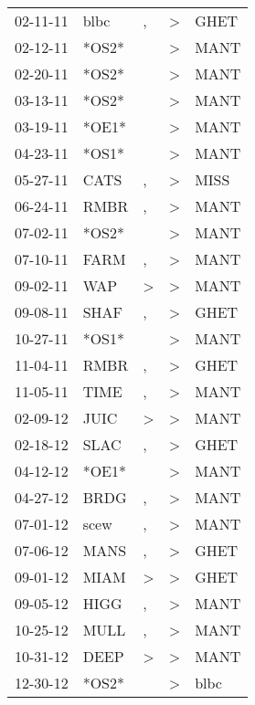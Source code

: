\begin{supertabular}{lllll}
 02-11-11 &   blbc &             , &  \textgreater &  GHET \\
 02-12-11 &  *OS2* &               &  \textgreater &  MANT \\
 02-20-11 &  *OS2* &               &  \textgreater &  MANT \\
 03-13-11 &  *OS2* &               &  \textgreater &  MANT \\
 03-19-11 &  *OE1* &               &  \textgreater &  MANT \\
 04-23-11 &  *OS1* &               &  \textgreater &  MANT \\
 05-27-11 &   CATS &             , &  \textgreater &  MISS \\
 06-24-11 &   RMBR &             , &  \textgreater &  MANT \\
 07-02-11 &  *OS2* &               &  \textgreater &  MANT \\
 07-10-11 &   FARM &             , &  \textgreater &  MANT \\
 09-02-11 &    WAP &  \textgreater &  \textgreater &  MANT \\
 09-08-11 &   SHAF &             , &  \textgreater &  GHET \\
 10-27-11 &  *OS1* &               &  \textgreater &  MANT \\
 11-04-11 &   RMBR &             , &  \textgreater &  GHET \\
 11-05-11 &   TIME &             , &  \textgreater &  MANT \\
 02-09-12 &   JUIC &  \textgreater &  \textgreater &  MANT \\
 02-18-12 &   SLAC &             , &  \textgreater &  GHET \\
 04-12-12 &  *OE1* &               &  \textgreater &  MANT \\
 04-27-12 &   BRDG &             , &  \textgreater &  MANT \\
 07-01-12 &   scew &             , &  \textgreater &  MANT \\
 07-06-12 &   MANS &             , &  \textgreater &  GHET \\
 09-01-12 &   MIAM &  \textgreater &  \textgreater &  GHET \\
 09-05-12 &   HIGG &             , &  \textgreater &  MANT \\
 10-25-12 &   MULL &             , &  \textgreater &  MANT \\
 10-31-12 &   DEEP &  \textgreater &  \textgreater &  MANT \\
 12-30-12 &  *OS2* &               &  \textgreater &  blbc \\

\end{supertabular}
